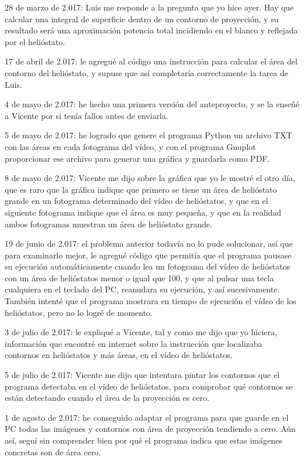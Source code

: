 28 de marzo de 2.017: Luis me responde a la pregunta que yo hice ayer. Hay que calcular una integral de superficie dentro de un contorno de proyección, y su resultado será una aproximación potencia total incidiendo en el blanco y reflejada por el helióstato.

17 de abril de 2.017: le agregué al código una instrucción para calcular el área del contorno del helióstato, y supuse que así completaría correctamente la tarea de Luis.

4 de mayo de 2.017: he hecho una primera versión del anteproyecto, y se la enseñé a Vicente por si tenía fallos antes de enviarla.

5 de mayo de 2.017: he logrado que genere el programa Python un archivo TXT con las áreas en cada fotograma del vídeo, y con el programa Gnuplot proporcionar ese archivo para generar una gráfica y guardarla como PDF.

8 de mayo de 2.017: Vicente me dijo sobre la gráfica que yo le mostré el otro día, que es raro que la gráfica indique que primero se tiene un área de helióstato grande en un fotograma determinado del vídeo de helióstatos, y que en el siguiente fotograma indique que el área es muy pequeña, y que en la realidad ambos fotogramas muestran un área de helióstato grande.

19 de junio de 2.017: el problema anterior todavía no lo pude solucionar, así que para examinarlo mejor, le agregué código que permitía que el programa pausase su ejecución automáticamente cuando lea un fotograma del vídeo de helióstatos con un área de helióstatos menor o igual que 100, y que al pulsar una tecla cualquiera en el teclado del PC, reanudara su ejecución, y así sucesivamente. También intenté que el programa mostrara en tiempo de ejecución el vídeo de los helióstatos, pero no lo logré de momento.

3 de julio de 2.017: le expliqué a Vicente, tal y como me dijo que yo hiciera, información que encontré en internet sobre la instrucción que localizaba contornos en helióstatos y más áreas, en el vídeo de helióstatos.

5 de julio de 2.017: Vicente me dijo que intentara pintar los contornos que el programa detectaba en el vídeo de helióstatos, para comprobar qué contornos se están detectando cuando el área de la proyección es cero.

1 de agosto de 2.017: he conseguido adaptar el programa para que guarde en el PC todas las imágenes y contornos con área de proyección tendiendo a cero. Aún así, seguí sin comprender bien por qué el programa indica que estas imágenes concretas son de área cero.

